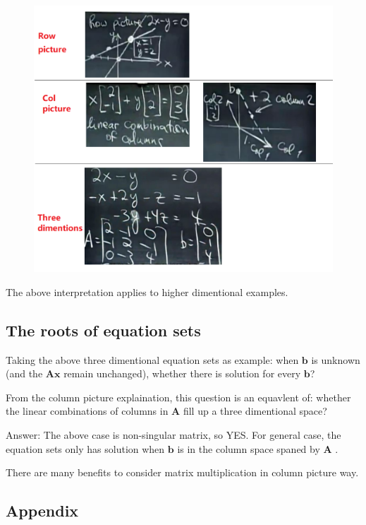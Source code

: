 \documentclass{article}
\begin{document}
\begin{figure}[h]
  \centering\includegraphics[scale=0.45]{1.png}
\end{figure}

The above interpretation applies to higher dimentional examples.

\subsection{The roots of equation sets}
Taking the above three dimentional equation sets as example: when
$\boldsymbol{b}$ is unknown (and the $\boldsymbol{Ax}$ remain unchanged),
whether there is solution for every $\boldsymbol{b}$?

From the column picture explaination, this question is an equavlent of: whether
the linear combinations of columns in $\boldsymbol{A}$ fill up a three
dimentional space?

Answer:
The above case is non-singular matrix, so YES.
For general case, the equation sets {\color{red} only has solution when $\boldsymbol{b}$ is
in the column space spaned by $\boldsymbol{A}$ }.

There are many benefits to consider matrix multiplication in {\color{red} column
  picture} way.

\subsection{Appendix}
\end{document}

